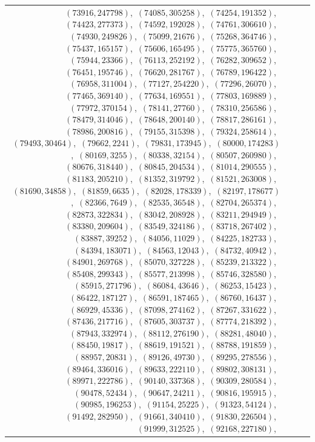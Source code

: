 \documentclass[11pt]{article}
\begin{document}
\begin{longtable}{@{}rrl>{\raggedright\arraybackslash}p{}@{}}
$(73916,247798)$,\allowbreak\ $(74085,305258)$,\allowbreak\ $(74254,191352)$,\allowbreak\ $(74423,277373)$,\allowbreak\ $(74592,192028)$,\allowbreak\ $(74761,306610)$,\allowbreak\ $(74930,249826)$,\allowbreak\ $(75099,21676)$,\allowbreak\ $(75268,364746)$,\allowbreak\ $(75437,165157)$,\allowbreak\ $(75606,165495)$,\allowbreak\ $(75775,365760)$,\allowbreak\ $(75944,23366)$,\allowbreak\ $(76113,252192)$,\allowbreak\ $(76282,309652)$,\allowbreak\ $(76451,195746)$,\allowbreak\ $(76620,281767)$,\allowbreak\ $(76789,196422)$,\allowbreak\ $(76958,311004)$,\allowbreak\ $(77127,254220)$,\allowbreak\ $(77296,26070)$,\allowbreak\ $(77465,369140)$,\allowbreak\ $(77634,169551)$,\allowbreak\ $(77803,169889)$,\allowbreak\ $(77972,370154)$,\allowbreak\ $(78141,27760)$,\allowbreak\ $(78310,256586)$,\allowbreak\ $(78479,314046)$,\allowbreak\ $(78648,200140)$,\allowbreak\ $(78817,286161)$,\allowbreak\ $(78986,200816)$,\allowbreak\ $(79155,315398)$,\allowbreak\ $(79324,258614)$,\allowbreak\ $(79493,30464)$,\allowbreak\ $(79662,2241)$,\allowbreak\ $(79831,173945)$,\allowbreak\ $(80000,174283)$,\allowbreak\ $(80169,3255)$,\allowbreak\ $(80338,32154)$,\allowbreak\ $(80507,260980)$,\allowbreak\ $(80676,318440)$,\allowbreak\ $(80845,204534)$,\allowbreak\ $(81014,290555)$,\allowbreak\ $(81183,205210)$,\allowbreak\ $(81352,319792)$,\allowbreak\ $(81521,263008)$,\allowbreak\ $(81690,34858)$,\allowbreak\ $(81859,6635)$,\allowbreak\ $(82028,178339)$,\allowbreak\ $(82197,178677)$,\allowbreak\ $(82366,7649)$,\allowbreak\ $(82535,36548)$,\allowbreak\ $(82704,265374)$,\allowbreak\ $(82873,322834)$,\allowbreak\ $(83042,208928)$,\allowbreak\ $(83211,294949)$,\allowbreak\ $(83380,209604)$,\allowbreak\ $(83549,324186)$,\allowbreak\ $(83718,267402)$,\allowbreak\ $(83887,39252)$,\allowbreak\ $(84056,11029)$,\allowbreak\ $(84225,182733)$,\allowbreak\ $(84394,183071)$,\allowbreak\ $(84563,12043)$,\allowbreak\ $(84732,40942)$,\allowbreak\ $(84901,269768)$,\allowbreak\ $(85070,327228)$,\allowbreak\ $(85239,213322)$,\allowbreak\ $(85408,299343)$,\allowbreak\ $(85577,213998)$,\allowbreak\ $(85746,328580)$,\allowbreak\ $(85915,271796)$,\allowbreak\ $(86084,43646)$,\allowbreak\ $(86253,15423)$,\allowbreak\ $(86422,187127)$,\allowbreak\ $(86591,187465)$,\allowbreak\ $(86760,16437)$,\allowbreak\ $(86929,45336)$,\allowbreak\ $(87098,274162)$,\allowbreak\ $(87267,331622)$,\allowbreak\ $(87436,217716)$,\allowbreak\ $(87605,303737)$,\allowbreak\ $(87774,218392)$,\allowbreak\ $(87943,332974)$,\allowbreak\ $(88112,276190)$,\allowbreak\ $(88281,48040)$,\allowbreak\ $(88450,19817)$,\allowbreak\ $(88619,191521)$,\allowbreak\ $(88788,191859)$,\allowbreak\ $(88957,20831)$,\allowbreak\ $(89126,49730)$,\allowbreak\ $(89295,278556)$,\allowbreak\ $(89464,336016)$,\allowbreak\ $(89633,222110)$,\allowbreak\ $(89802,308131)$,\allowbreak\ $(89971,222786)$,\allowbreak\ $(90140,337368)$,\allowbreak\ $(90309,280584)$,\allowbreak\ $(90478,52434)$,\allowbreak\ $(90647,24211)$,\allowbreak\ $(90816,195915)$,\allowbreak\ $(90985,196253)$,\allowbreak\ $(91154,25225)$,\allowbreak\ $(91323,54124)$,\allowbreak\ $(91492,282950)$,\allowbreak\ $(91661,340410)$,\allowbreak\ $(91830,226504)$,\allowbreak\ $(91999,312525)$,\allowbreak\ $(92168,227180)$,\allowbreak\ 
\end{longtable}
\end{document}
